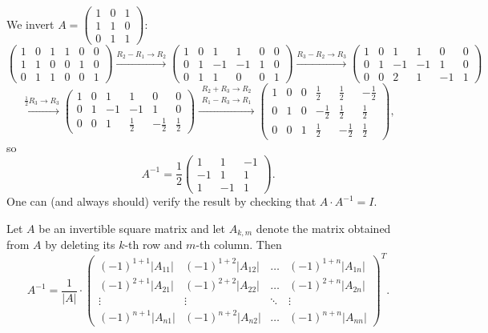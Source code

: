 \begin{example}
We invert $A = \left ( \begin{smallmatrix} 1 & 0 & 1\\ 1 & 1 & 0\\ 0 & 1 & 1 \end{smallmatrix} \right )$:
\[
\left ( \begin{array}{ccc|ccc}
1 & 0 & 1 & 1 & 0 & 0\\ 1 & 1 & 0 & 0 & 1 & 0\\ 0 & 1 & 1 & 0 & 0 & 1
\end{array} \right )
\xrightarrow{R_2-R_1\to R_2}
\left ( \begin{array}{ccc|ccc}
1 & 0 & 1 & 1 & 0 & 0\\ 0 & 1 & -1 & -1 & 1 & 0\\ 0 & 1 & 1 & 0 & 0 & 1
\end{array} \right )
\xrightarrow{R_3-R_2\to R_3}
\left ( \begin{array}{ccc|ccc}
1 & 0 & 1 & 1 & 0 & 0\\ 0 & 1 & -1 & -1 & 1 & 0\\ 0 & 0 & 2 & 1 & -1 & 1
\end{array} \right )
\]
\[
\xrightarrow{\frac12 R_3\to R_3}
\left ( \begin{array}{ccc|ccc}
1 & 0 & 1 & 1 & 0 & 0\\ 0 & 1 & -1 & -1 & 1 & 0\\ 0 & 0 & 1 & \tfrac12 & -\tfrac12 & \tfrac12
\end{array} \right )
\xrightarrow{\substack{R_2+R_3\to R_2\\ R_1-R_3\to R_1}}
\left ( \begin{array}{ccc|ccc}
1 & 0 & 0 & \tfrac12 & \tfrac12 & -\tfrac12\\
0 & 1 & 0 & -\tfrac12 & \tfrac12 & \tfrac12\\
0 & 0 & 1 & \tfrac12 & -\tfrac12 & \tfrac12
\end{array} \right ),
\]
so
\[
A^{-1} = \frac12 \left ( \begin{array}{ccc} 1 & 1 & -1\\ -1 & 1 & 1\\ 1 & -1 & 1 \end{array} \right ).
\]
One can (and always should) verify the result by checking that $A\cdot A^{-1} = I$.
\end{example}

\begin{fact}
Let $A$ be an invertible square matrix and let $A_{k,m}$ denote the matrix obtained from $A$ by deleting its
$k$-th row and $m$-th column. Then
\[
A^{-1} = \frac{1}{|A|}\cdot
\left( \begin{array}{cccc}
(-1)^{1+1} |A_{11}| & (-1)^{1+2} |A_{12}| & \ldots & (-1)^{1+n} |A_{1n}| \\
(-1)^{2+1} |A_{21}| & (-1)^{2+2} |A_{22}| & \ldots & (-1)^{2+n} |A_{2n}| \\
\vdots & \vdots & \ddots & \vdots \\
(-1)^{n+1} |A_{n1}| & (-1)^{n+2} |A_{n2}| & \ldots & (-1)^{n+n}|A_{nn}|
\end{array} \right)^T.
\]
\end{fact}

